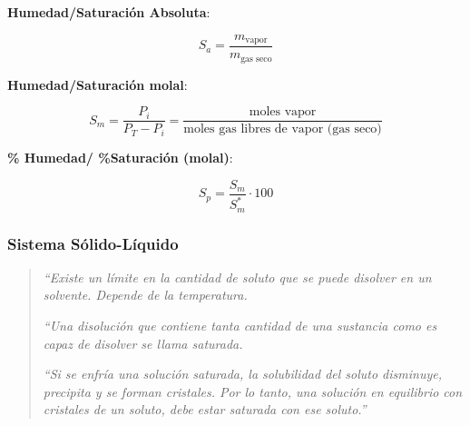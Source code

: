             \textbf{Humedad/Saturación Absoluta}:
            
            \begin{equation}
            \label{eq:humedad_absoluta}
                S_{a} = \frac{m_{\text{vapor}}}{m_{\text{gas seco}}}
            \end{equation}
            
            \textbf{Humedad/Saturación molal}:
            
            \begin{equation}
            \label{eq:humedad_molal}
                S_{m} = \frac{P_{i}}{P_{T} - P_{i}} = \frac{\text{moles vapor}}{\text{moles gas libres de vapor (gas seco)}}
            \end{equation}
            
            \textbf{\% Humedad/ \%Saturación (molal)}:
            
            \begin{equation}
            \label{eq:per_humedad_molal}
                S_{p} = \frac{S_{m}}{S_{m}^{*}} \cdot 100
            \end{equation}
        \newpage
            
        \subsubsection{Sistema Sólido-Líquido}
        
            
            \begin{quote}
                \textit{``Existe un límite en la cantidad de soluto que se puede disolver en un solvente. Depende de la temperatura.}
                
                \textit{``Una disolución que contiene tanta cantidad de una sustancia como es capaz de disolver se llama saturada.}
                
                \textit{``Si se enfría una solución saturada, la solubilidad del soluto disminuye, precipita y se forman cristales. Por lo tanto, una solución en equilibrio con cristales de un soluto, debe estar saturada con ese soluto.''}
            \end{quote}
            
            
